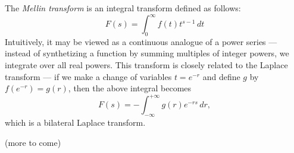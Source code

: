 \documentclass[12pt]{article}
\begin{document}
The \emph{Mellin transform} is an integral transform defined as follows:
\[
 F(s) = \int_0^\infty f(t) t^{s-1} \, dt
\]
Intuitively, it may be viewed as a continuous analogue of a power series 
--- instead of synthetizing a function by summing multiples of integer
powers, we integrate over all real powers.  This transform is closely
related to the Laplace transform --- if we make a change of variables
$t = e^{-r}$  and define $g$ by $f(e^{-r}) = g(r)$, then the above integral 
becomes
\[
 F(s) = -\int_{-\infty}^{+\infty} g(r) e^{-rs} \, dr ,
\]
which is a bilateral Laplace transform.

(more to come)
\end{document}
